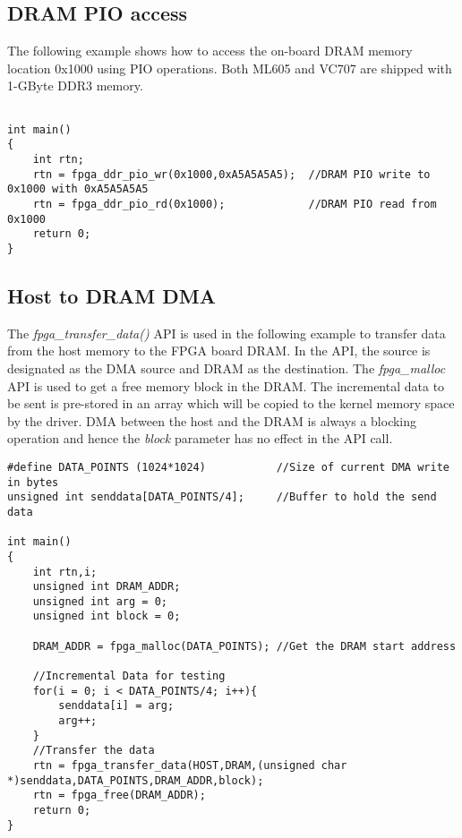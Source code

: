 \subsection{DRAM PIO access}
The following example shows how to access the on-board DRAM memory location 0x1000 using PIO operations.
Both ML605 and VC707 are shipped with 1-GByte DDR3 memory.

\begin{verbatim}

int main() 
{   
    int rtn;
    rtn = fpga_ddr_pio_wr(0x1000,0xA5A5A5A5);  //DRAM PIO write to 0x1000 with 0xA5A5A5A5
    rtn = fpga_ddr_pio_rd(0x1000);             //DRAM PIO read from 0x1000
    return 0;
}
\end{verbatim}  


\subsection{Host to DRAM DMA}
The \emph{fpga\_transfer\_data()} API is used in the following example to transfer data from the host memory to the FPGA board DRAM.
In the API, the source is designated as the DMA source and DRAM as the destination.
The \emph{fpga\_malloc} API is used to get a free memory block in the DRAM.
The incremental data to be sent is pre-stored in an array which will be copied to the kernel memory space by the driver.
DMA between the host and the DRAM is always a blocking operation and hence the \emph{block} parameter has no effect in the API call.

\begin{verbatim}
#define DATA_POINTS (1024*1024)           //Size of current DMA write in bytes
unsigned int senddata[DATA_POINTS/4];     //Buffer to hold the send data

int main() 
{
    int rtn,i;
    unsigned int DRAM_ADDR;
    unsigned int arg = 0;
    unsigned int block = 0;
    
    DRAM_ADDR = fpga_malloc(DATA_POINTS); //Get the DRAM start address
    
    //Incremental Data for testing
    for(i = 0; i < DATA_POINTS/4; i++){
        senddata[i] = arg;
        arg++;
    }
    //Transfer the data
    rtn = fpga_transfer_data(HOST,DRAM,(unsigned char *)senddata,DATA_POINTS,DRAM_ADDR,block);
    rtn = fpga_free(DRAM_ADDR);
    return 0;
}
\end{verbatim}

